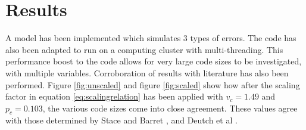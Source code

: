 \chapter{Results}
	A model has been implemented which simulates 3 types of errors. The code has also been adapted to run on a computing cluster with multi-threading. This performance boost to the code allows for very large code sizes to be investigated, with multiple variables. Corroboration of results with literature has also been performed. Figure \ref{fig:unscaled} and figure \ref{fig:scaled} show how after the scaling factor in equation \ref{eq:scalingrelation} has been applied with $v_c = 1.49$ and $p_c = 0.103$, the various code sizes come into close agreement. These values agree with those determined by Stace and Barret \cite{Stace2010}, and Deutch et al \cite{Deutsch1985}.
	\\\\
